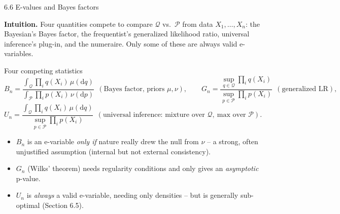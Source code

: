 \documentclass[aspectratio=169,10pt]{beamer}
\newcommand{\cP}{\mathcal{P}}
\newcommand{\cQ}{\mathcal{Q}}
\begin{document}
\begin{frame}{6.6 E-values and Bayes factors}

\textbf{Intuition.} Four quantities compete to compare $\cQ$ vs.\ $\cP$
from data $X_1,\dots,X_n$: the Bayesian's Bayes factor, the
frequentist's generalized likelihood ratio, universal inference's
plug-in, and the numeraire. Only some of these are always valid
e-variables.

\begin{block}{Four competing statistics}
\[
B_n = \frac{\int_{\cQ}\prod_i q(X_i)\,\mu(\mathrm{d}q)}{\int_{\cP}\prod_i p(X_i)\,\nu(\mathrm{d}p)}
\ \ (\text{Bayes factor, priors } \mu,\nu),
\qquad
G_n = \frac{\sup_{q\in\cQ}\prod_i q(X_i)}{\sup_{p\in\cP}\prod_i p(X_i)}
\ \ (\text{generalized LR}),
\]
\[
U_n = \frac{\int_{\cQ}\prod_i q(X_i)\,\mu(\mathrm{d}q)}{\sup_{p\in\cP}\prod_i p(X_i)}
\ \ (\text{universal inference: mixture over } \cQ,\ \text{max over } \cP).
\]
\end{block}

\begin{itemize}
\item $B_n$ is an e-variable \emph{only if} nature really drew the null
from $\nu$ -- a strong, often unjustified assumption (internal but not
external consistency).
\item $G_n$ (Wilks' theorem) needs regularity conditions and only gives
an \emph{asymptotic} p-value.
\item $U_n$ is \emph{always} a valid e-variable, needing only densities
-- but is generally sub-optimal (Section 6.5).
\end{itemize}
\end{frame}
\end{document}
